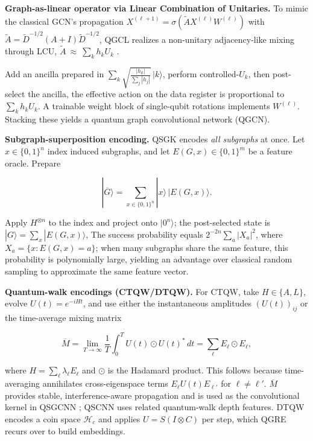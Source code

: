 \documentclass[11pt]{article}
\begin{document}
\noindent \textbf{Graph-as-linear operator via Linear Combination of Unitaries.} \citep{zheng2021qgcn} To mimic the classical GCN's propagation $X^{(\ell+1)}=\sigma(\tilde A X^{(\ell)}W^{(\ell)})$ with $\tilde A=\tilde D^{-1/2}(A+I)\tilde D^{-1/2}$, QGCL realizes a non-unitary adjacency-like mixing through LCU, $\tilde A\ \approx\ \sum_{k} h_k U_k$
.

Add an ancilla prepared in $\sum_k\sqrt{\tfrac{|h_k|}{\sum_j |h_j|}}\,|k\rangle$, perform controlled-$U_k$, then post-select the ancilla, the effective action on the data register is proportional to $\sum_k h_k U_k$. A trainable weight block of single-qubit rotations implements $W^{(\ell)}$. Stacking these yields a quantum graph convolutional network (QGCN).

\noindent \textbf{Subgraph-superposition encoding.} QSGK \citep{kishi2021qsgk} encodes \emph{all subgraphs} at once. Let $x\in\{0,1\}^n$ index induced subgraphs, and let $E(G,x)\in\{0,1\}^m$ be a feature oracle. Prepare

$$
|\overline{G}\rangle=\sum_{x\in\{0,1\}^n}\!|x\rangle\,|E(G,x)\rangle.
$$

Apply $H^{\otimes n}$ to the index and project onto $|0^n\rangle$; the post-selected state is $|G\rangle=\sum_{x}|E(G,x)\rangle$,  The success probability equals $2^{-2n}\sum_a |X_a|^2$, where $X_a=\{x: E(G,x)=a\}$; when many subgraphs share the same feature, this probability is polynomially large, yielding an advantage over classical random sampling to approximate the same feature vector.

\noindent \textbf{Quantum-walk encodings (CTQW/DTQW).} \citep{godsil2013avgmixing,coutinho2017avgmixing,bai2018qsgcnn,zhang2019qscnn,dernbach2018qw_nn,dernbach2019qw_feature_coin} For CTQW, take $H\in\{A,L\}$, evolve $U(t)=e^{-iHt}$, and use either the instantaneous amplitudes $(U(t))_{ij}$ or the time-average mixing matrix

$$
\overline{M}=\lim_{T\to\infty}\frac{1}{T}\!\int_0^T\!U(t)\odot U(t)^\ast \,dt
=\sum_{\ell} E_\ell\odot E_\ell,
$$

where $H=\sum_\ell \lambda_\ell E_\ell$ and $\odot$ is the Hadamard product. This follows because time-averaging annihilates cross-eigenspace terms $E_\ell U(t) E_{\ell'}$ for $\ell\ne\ell'$. $\overline{M}$ provides stable, interference-aware propagation and is used as the convolutional kernel in QSGCNN \cite{bai2018qsgcnn}; QSCNN \cite{zhang2019qscnn} uses related quantum-walk depth features. DTQW encodes a coin space $\mathcal{H}_c$ and applies $U=S(I\otimes C)$ per step, which QGRE recurs over to build embeddings.
\end{document}
